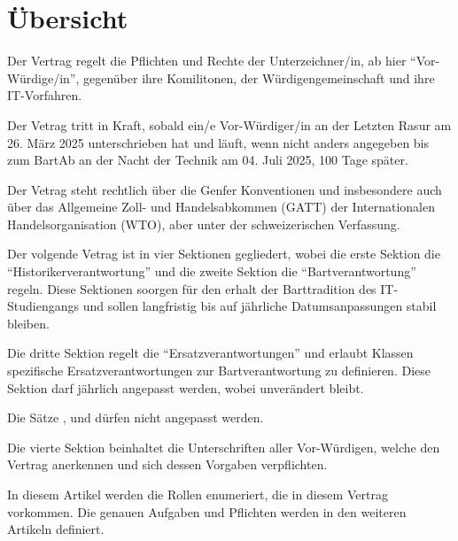 \documentclass[fontsize=12pt,parskip=half]{scrartcl}
\begin{document}
\section{Übersicht}
\begin{contract}

  \Clause[title={Zweck}]
  Der Vertrag regelt die Pflichten und Rechte der Unterzeichner/in, ab hier ``Vor-Würdige/in'', gegenüber ihre Komilitonen, der Würdigengemeinschaft und ihre IT-Vorfahren.

  \Clause[title={Gültigkeit}]\label{gueltigkeit}
  Der Vetrag tritt in Kraft, sobald ein/e Vor-Würdiger/in an der Letzten Rasur am 26. März 2025 unterschrieben hat und läuft, wenn nicht anders angegeben bis zum BartAb
  an der Nacht der Technik am 04. Juli 2025, 100 Tage später.

  Der Vetrag steht rechtlich über die Genfer Konventionen und insbesondere auch über das Allgemeine Zoll- und Handelsabkommen (GATT) der Internationalen Handelsorganisation (WTO),
  aber unter der schweizerischen Verfassung.

  \Clause[title={Struktur}]
  Der volgende Vetrag ist in vier Sektionen gegliedert, wobei die erste Sektion die ``Historikerverantwortung'' und die zweite Sektion die ``Bartverantwortung'' regeln. Diese Sektionen
  soorgen für den erhalt der Barttradition des IT-Studiengangs und sollen langfristig bis auf jährliche Datumsanpassungen stabil bleiben. \label{struktur.base}

  Die dritte Sektion regelt die ``Ersatzverantwortungen'' und erlaubt Klassen spezifische Ersatzverantwortungen zur Bartverantwortung zu definieren. Diese Sektion darf jährlich angepasst werden,
  wobei  unverändert bleibt.\label{struktur.ersatz}

  Die Sätze ,  und  dürfen nicht angepasst werden.\label{struktur.schutz}

  Die vierte Sektion beinhaltet die Unterschriften aller Vor-Würdigen, welche den Vertrag anerkennen und sich dessen Vorgaben verpflichten.

  \Clause[title={Rollen}]
  In diesem Artikel werden die Rollen enumeriert, die in diesem Vertrag vorkommen. Die genauen Aufgaben und Pflichten werden in den weiteren Artikeln definiert.


\end{contract}
\end{document}
